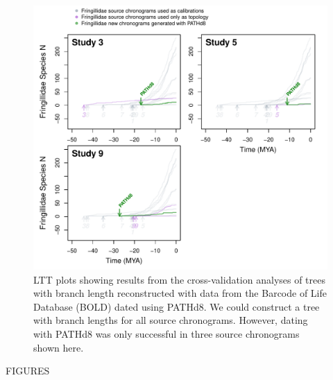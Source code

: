 \newpage
\begin{figure}[!h]
\includegraphics{../figures/fig_crossval_boldsumm.pdf}
\caption{LTT plots showing results from the cross-validation analyses of trees with branch length reconstructed with data from the Barcode of Life Database (BOLD) dated using PATHd8. We could construct a tree with branch lengths for all source chronograms. However, dating with PATHd8 was only successful in three source chronograms shown here.}
\label{fig:cvbold}
\end{figure}
FIGURES

